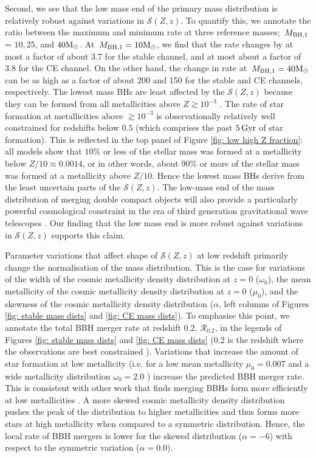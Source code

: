 \documentclass[linenumbers,twocolumn]{aastex631}
\newcommand{\Msun}{\ensuremath{\rm{M}_{\odot}}\xspace}
\newcommand{\Gyr}{\ensuremath{\,\rm{Gyr}}\xspace}
\newcommand{\Mbheen}{\ensuremath{\,M_{\rm BH, 1}}\xspace}
\newcommand{\SFRDzZ}{\ensuremath{\mathcal{S}(Z,z)}\xspace}
\begin{document}
Second, we see that the low mass end of the primary mass distribution is relatively robust against variations in \SFRDzZ. 
To quantify this, we annotate the ratio between the maximum and minimum rate at three reference masses; \Mbheen = $10, 25$, and $40\Msun$.
At $\Mbheen=10\Msun$, we find that the rate changes by at most a factor of about 3.7 for the stable channel, and at most about a factor of 3.8 for the CE channel. 
On the other hand, the change in rate at $\Mbheen=40\Msun$ can be as high as a factor of about 200 and 150 for the stable and CE channels, respectively. 
%
The lowest mass BHs are least affected by the \SFRDzZ because they can be formed from all metallicities above $Z\gtrsim10^{-3}$ \citep[see e.g., Figures 7 and 13 from ][]{vanson+2022}.
The rate of star formation at metallicities above $\gtrsim 10^{-3}$ is observationally relatively well constrained for redshifts below $0.5$ (which comprises the past $5\Gyr$ of star formation). 
This is reflected in the top panel of Figure \ref{fig: low high Z fraction}: all models show that $10\%$ or less of the stellar mass was formed at a metallicity below $Z/10 \approx 0.0014$, or in other words, about $90\%$ or more of the stellar mass was formed at a metallicity above $Z/10$. Hence the lowest mass BHs derive from the least uncertain parts of the \SFRDzZ.
%
The low-mass end of the mass distribution of merging double compact objects will also provide a particularly powerful cosmological constraint in the era of third generation gravitational wave telescopes \citep{MariaEzquiaga2022}. Our finding that the low mass end is more robust against variations in \SFRDzZ supports this claim. 

Parameter variations that affect shape of \SFRDzZ at low redshift primarily change the normalisation of the mass distribution. This is the case for variations of the width of the cosmic metallicity density distribution at $z=0$ ($\omega_0$), the mean metallicity of the cosmic metallicity density distribution at $z=0$ ($\mu_0$), and the skewness of the cosmic metallicity density distribution ($\alpha$, left columns of Figures \ref{fig: stable mass dists} and \ref{fig: CE mass dists}).
To emphasise this point, we annotate the total BBH merger rate at redshift 0.2, $\mathcal{R}_{0.2}$, in the legends of Figures \ref{fig: stable mass dists} and \ref{fig: CE mass dists} (0.2 is the redshift where the observations are best constrained \citealt{GWTC3_popPaper2021}). 
%
Variations that increase the amount of star formation at low metallicity (i.e. for a low mean metallicity $\mu_0=0.007$ and a wide metallicity distribution $\omega_0 = 2.0$ ) increase the predicted BBH merger rate. This is consistent with other work that finds merging BBHs form more efficiently at low metallicities \citep[e.g.][]{BelczynskiVink2010, Stevenson+2017,Mapelli2017,Chruslinska2019_effectCO,Broekgaarden+2021b}.
A more skewed cosmic metallicity density distribution pushes the peak of the distribution to higher metallicities and thus forms more stars at high metallicity when compared to a symmetric distribution. Hence, the local rate of BBH mergers is lower for the skewed distribution ($\alpha = -6$) with respect to the symmetric variation ($\alpha = 0.0$).
\end{document}
